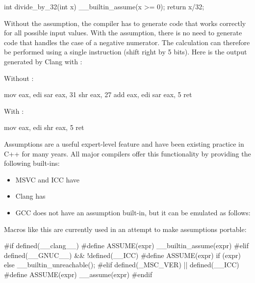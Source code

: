 \begin{codeblock}
int divide_by_32(int x) {
  __builtin_assume(x >= 0);
  return x/32;
}
\end{codeblock}

Without the assumption, the compiler has to generate code that works correctly for all possible input values. With the assumption, there is no need to generate code that handles the case of a negative numerator. The calculation can therefore be performed using a single instruction (shift right by 5 bits). Here is the output generated by Clang with :

\begin{multicols}{2}
Without :

\begin{codeblock}
  mov eax, edi
  sar eax, 31
  shr eax, 27
  add eax, edi
  sar eax, 5
  ret
\end{codeblock}

\columnbreak

With :

\begin{codeblock}
  mov eax, edi
  shr eax, 5
  ret
\end{codeblock}

\end{multicols}

Assumptions are a useful expert-level feature and have been existing practice in C++ for many years. All major compilers offer this functionality by providing the following built-ins:

\begin{itemize}
\item MSVC and ICC have 
\item Clang has 
\item GCC does not have an assumption built-in, but it can be emulated as follows: \\ 
\end{itemize}

Macros like this are currently used in an attempt to make assumptions portable:

\begin{codeblock}

#if defined(__clang__)
  #define ASSUME(expr) __builtin_assume(expr)
#elif defined(__GNUC__) && !defined(__ICC)
  #define ASSUME(expr) if (expr) {} else { __builtin_unreachable(); }
#elif defined(_MSC_VER) || defined(__ICC)
  #define ASSUME(expr) __assume(expr)
#endif
\end{codeblock}\vspace{5mm}

